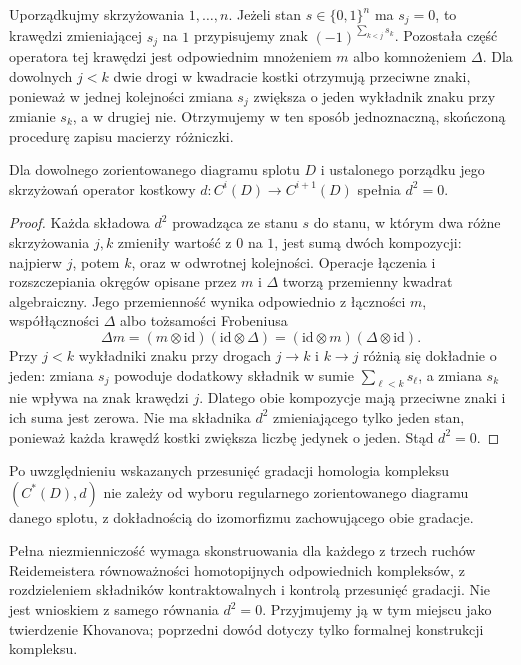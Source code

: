 \begin{uwaga}
Uporządkujmy skrzyżowania $1,\dots,n$. Jeżeli stan
$s\in\{0,1\}^n$ ma $s_j=0$, to krawędzi zmieniającej
$s_j$ na $1$ przypisujemy znak
$(-1)^{\sum_{k<j}s_k}$. Pozostała część operatora tej
krawędzi jest odpowiednim mnożeniem $m$ albo
komnożeniem $\Delta$. Dla dowolnych $j<k$ dwie
drogi w kwadracie kostki otrzymują przeciwne znaki,
ponieważ w jednej kolejności zmiana $s_j$ zwiększa
o jeden wykładnik znaku przy zmianie $s_k$, a w drugiej
nie. Otrzymujemy w ten sposób jednoznaczną, skończoną
procedurę zapisu macierzy różniczki.
\end{uwaga}

\begin{stwierdzenie}
Dla dowolnego zorientowanego diagramu splotu $D$ i ustalonego
porządku jego skrzyżowań operator kostkowy
$d:C^i(D)\to C^{i+1}(D)$ spełnia $d^2=0$.
\end{stwierdzenie}

\begin{proof}
Każda składowa $d^2$ prowadząca ze stanu $s$ do stanu,
w którym dwa różne skrzyżowania $j,k$ zmieniły wartość
z $0$ na $1$, jest sumą dwóch kompozycji: najpierw $j$,
potem $k$, oraz w odwrotnej kolejności. Operacje
łączenia i rozszczepiania okręgów opisane przez $m$
i $\Delta$ tworzą przemienny kwadrat algebraiczny.
Jego przemienność wynika odpowiednio z łączności
$m$, współłączności $\Delta$ albo tożsamości Frobeniusa
\[
\Delta m=(m\otimes\mathrm{id})(\mathrm{id}\otimes\Delta)
=(\mathrm{id}\otimes m)(\Delta\otimes\mathrm{id}).
\]
Przy $j<k$ wykładniki znaku przy drogach $j\to k$
i $k\to j$ różnią się dokładnie o jeden: zmiana $s_j$
powoduje dodatkowy składnik w sumie $\sum_{\ell<k}s_\ell$,
a zmiana $s_k$ nie wpływa na znak krawędzi $j$.
Dlatego obie kompozycje mają przeciwne znaki
i ich suma jest zerowa. Nie ma składnika $d^2$
zmieniającego tylko jeden stan, ponieważ każda krawędź
kostki zwiększa liczbę jedynek o jeden. Stąd $d^2=0$.
\end{proof}

\begin{twierdzenie}
Po uwzględnieniu wskazanych przesunięć gradacji
homologia kompleksu $(C^*(D),d)$ nie zależy od wyboru
regularnego zorientowanego diagramu danego splotu,
z dokładnością do izomorfizmu zachowującego obie gradacje.
\end{twierdzenie}

\begin{uwaga}
Pełna niezmienniczość wymaga skonstruowania dla każdego
z trzech ruchów Reidemeistera równoważności homotopijnych
odpowiednich kompleksów, z rozdzieleniem składników
kontraktowalnych i kontrolą przesunięć gradacji.
Nie jest wnioskiem z samego równania $d^2=0$.
Przyjmujemy ją w tym miejscu jako twierdzenie Khovanova;
poprzedni dowód dotyczy tylko formalnej konstrukcji kompleksu.
\end{uwaga}


